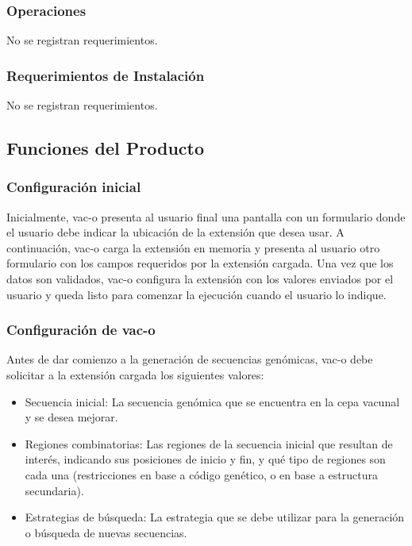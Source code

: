 \documentclass[10pt,a4paper]{article}
\begin{document}
    \subsubsection{Operaciones}
    No se registran requerimientos.

    \subsubsection{Requerimientos de Instalaci\'on}
    No se registran requerimientos.

  \subsection{Funciones del Producto}
  
  \subsubsection{Configuraci\'on inicial}
  Inicialmente, vac-o presenta al usuario final una pantalla con un formulario
donde el usuario debe indicar la ubicaci\'on de la extensi\'on que desea usar. A
continuaci\'on, vac-o carga la extensi\'on en memoria y presenta al usuario otro
formulario con los campos requeridos por la extensi\'on cargada.
  Una vez que los datos son validados, vac-o configura la extensi\'on con los
valores enviados por el usuario y queda listo para comenzar la ejecuci\'on
cuando el usuario lo indique.

  \subsubsection{Configuraci\'on de vac-o}
  Antes de dar comienzo a la generaci\'on de secuencias gen\'omicas, vac-o debe
solicitar a la extensi\'on cargada los siguientes valores:
  \begin{itemize}
    \item Secuencia inicial: La secuencia gen\'omica que se encuentra en la cepa
vacunal y se desea mejorar.
    \item Regiones combinatorias: Las regiones de la secuencia inicial que
resultan de inter\'es, indicando sus posiciones de inicio y fin, y qu\'e tipo de
regiones son cada una (restricciones en base a c\'odigo gen\'etico, o en base a
estructura secundaria).
    \item Estrategias de b\'usqueda: La estrategia que se debe utilizar para la
generaci\'on o b\'usqueda de nuevas secuencias.
  \end{itemize}
  
\end{document}
